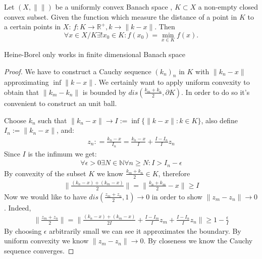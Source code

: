 \begin{theorem}
	Let $(X, \|\|)$ be a uniformly convex Banach space , $K \subset X$ a non-empty closed convex subset. Given the function which measure the distance of a point in $K$ to a certain points in $X$: $f:K \rightarrow \mathbb{R}^+, k \rightarrow \|k - x\|$. Then
	\begin{equation*}
		\forall x \in X\slash K \exists ! x_0 \in K: f(x_0) = \min_{x \in K} f(x).
	\end{equation*}
\end{theorem}

\begin{remark}
Heine-Borel only works in finite dimensional Banach space
\end{remark}

\begin{proof}
We have to construct a Cauchy sequence $(k_n)_n$ in $K$ with $\|k_n - x\|$ approximating $\inf \|k - x\|$. We certainly want to apply uniform convexity to obtain that $\|k_m - k_n\|$ is bounded by $dis(\frac{k_m + k_n}{2}, \partial K)$. In order to do so it's convenient to construct an unit ball.\par
Choose $k_n$ such that $\|k_n - x\| \rightarrow I:= \inf \{ \|k - x\|: k \in K\}$, also define $I_n := \|k_n - x\|$, and:
\begin{align*}
	z_n: = \frac{k_n - x}{I_n} = \frac{k_n - x}{I} + \frac{I - I_n}{I} z_n
\end{align*}
Since $I$ is the infimum 
we get:
\begin{align*}
	\forall \epsilon > 0 \exists N \in \mathbb{N} \forall n \geq N: I > I_n - \epsilon
\end{align*}
By convexity of the subset $K$ we know $\frac{k_m + k_n}{2}\in K $, therefore
\begin{align*}
	\|\frac{(k_n - x) + (k_m - x)}{2}\| = \|\frac{k_n + k_m}{2} -x \| \geq I
\end{align*}
Now we would like to have $dis(\frac{z_m + z_n}{2}, 1)\rightarrow 0 $ in order to show $\|z_m - z_n\| \rightarrow 0$. Indeed, 
\begin{align*}
	\|\frac{z_m + z_n}{2}\| = \| \frac{(k_n - x) + (k_m - x) }{2I} + \frac{I - I_m}{I}z_m + \frac{I - I_n}{I}z_n \| \ge 1 - \frac{\epsilon}{I}
\end{align*} 
By choosing $\epsilon$ arbitrarily small we can see it approximates the boundary. By uniform convexity we know $\| z_m - z_n \| \rightarrow 0$. By closeness we know the Cauchy sequence converges.
\end{proof}

